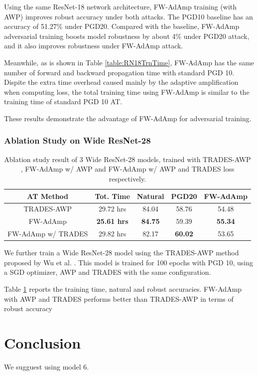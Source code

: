 \documentclass{article}
\begin{document}
            Using the same ResNet-18 network architecture, FW-AdAmp training (with AWP) improves robust accuracy under both attacks. The PGD10 baseline has an accuracy of 51.27\% under PGD20. Compared with the baseline, FW-AdAmp adversarial training boosts model robustness by about 4\% under PGD20 attack, and it also improves robustness under FW-AdAmp attack.
            
            Meanwhile, as is shown in Table \ref{table:RN18TrnTime}, FW-AdAmp has the same number of forward and backward propagation time with standard PGD 10. Dispite the extra time overhead caused mainly by the adaptive amplification when computing loss, the total training time using FW-AdAmp is similar to the training time of standard PGD 10 AT.
            
            These results demonstrate the advantage of FW-AdAmp for adversarial training.

        \subsubsection{Ablation Study on Wide ResNet-28}
            \begin{table}[h]
                \centering
                \begin{tabular}{ccccc}
                \hline
                AT Method          & Tot. Time          & Natural        & PGD20          & FW-AdAmp       \\ \hline
                TRADES-AWP         & 29.72 hrs          & 84.04          & 58.76          & 54.48          \\
                FW-AdAmp           & \textbf{25.61 hrs} & \textbf{84.75} & 59.39          & \textbf{55.34} \\
                FW-AdAmp w/ TRADES & 29.82 hrs          & 82.17          & \textbf{60.02} & 53.65          \\ \hline
                \end{tabular}
                \label{table:WRN28Ablation}
                \caption{Ablation study result of 3 Wide ResNet-28 models, trained with TRADES-AWP \cite{wu2020adversarial}, FW-AdAmp w/ AWP and FW-AdAmp w/ AWP and TRADES loss respectively.}
            \end{table}
            
            We further train a Wide ResNet-28 model using the TRADES-AWP method proposed by Wu et al. \cite{wu2020adversarial}. This model is trained for 100 epochs with PGD 10, using a SGD optimizer, AWP and TRADES with the same configuration.

            Table \ref{table:WRN28Ablation} reports the training time, natural and robust accuracies. FW-AdAmp with AWP and TRADES performs better than TRADES-AWP in terms of robust accuracy 


\section{Conclusion}\label{sec:Conclusion}
We sugguest using model 6.


\newpage
{\small

}
\end{document}
